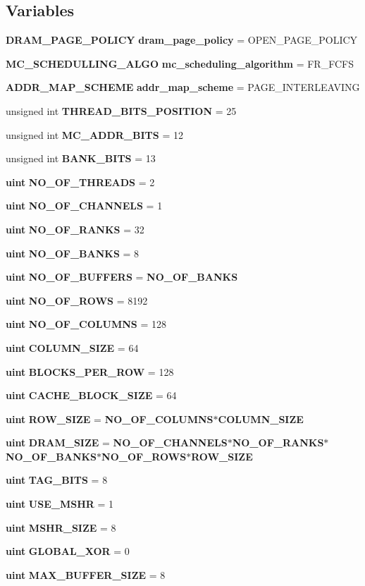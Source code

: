 \subsection*{Variables}
\begin{CompactItemize}
\item 
{\bf DRAM\_\-PAGE\_\-POLICY} {\bf dram\_\-page\_\-policy} = OPEN\_\-PAGE\_\-POLICY
\item 
{\bf MC\_\-SCHEDULLING\_\-ALGO} {\bf mc\_\-scheduling\_\-algorithm} = FR\_\-FCFS
\item 
{\bf ADDR\_\-MAP\_\-SCHEME} {\bf addr\_\-map\_\-scheme} = PAGE\_\-INTERLEAVING
\item 
unsigned int {\bf THREAD\_\-BITS\_\-POSITION} = 25
\item 
unsigned int {\bf MC\_\-ADDR\_\-BITS} = 12
\item 
unsigned int {\bf BANK\_\-BITS} = 13
\item 
{\bf uint} {\bf NO\_\-OF\_\-THREADS} = 2
\item 
{\bf uint} {\bf NO\_\-OF\_\-CHANNELS} = 1
\item 
{\bf uint} {\bf NO\_\-OF\_\-RANKS} = 32
\item 
{\bf uint} {\bf NO\_\-OF\_\-BANKS} = 8
\item 
{\bf uint} {\bf NO\_\-OF\_\-BUFFERS} = {\bf NO\_\-OF\_\-BANKS}
\item 
{\bf uint} {\bf NO\_\-OF\_\-ROWS} = 8192
\item 
{\bf uint} {\bf NO\_\-OF\_\-COLUMNS} = 128
\item 
{\bf uint} {\bf COLUMN\_\-SIZE} = 64
\item 
{\bf uint} {\bf BLOCKS\_\-PER\_\-ROW} = 128
\item 
{\bf uint} {\bf CACHE\_\-BLOCK\_\-SIZE} = 64
\item 
{\bf uint} {\bf ROW\_\-SIZE} = {\bf NO\_\-OF\_\-COLUMNS}$\ast${\bf COLUMN\_\-SIZE}
\item 
{\bf uint} {\bf DRAM\_\-SIZE} = {\bf NO\_\-OF\_\-CHANNELS}$\ast${\bf NO\_\-OF\_\-RANKS}$\ast${\bf NO\_\-OF\_\-BANKS}$\ast${\bf NO\_\-OF\_\-ROWS}$\ast${\bf ROW\_\-SIZE}
\item 
{\bf uint} {\bf TAG\_\-BITS} = 8
\item 
{\bf uint} {\bf USE\_\-MSHR} = 1
\item 
{\bf uint} {\bf MSHR\_\-SIZE} = 8
\item 
{\bf uint} {\bf GLOBAL\_\-XOR} = 0
\item 
{\bf uint} {\bf MAX\_\-BUFFER\_\-SIZE} = 8
\item 

\end{CompactItemize}

